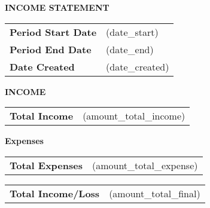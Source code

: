 \documentclass[english]{article}
\providecommand{\tabularnewline}{\\}
\newcommand{\lyxdot}{.}
\begin{document}


\noindent \textbf{INCOME STATEMENT}

\noindent \vspace{10mm}


\noindent \begin{tabular}{ll}
\textbf{Period Start Date} & (date\_start) \tabularnewline
\textbf{Period End Date} & (date\_end) \tabularnewline
\textbf{Date Created} & (date\_created) \tabularnewline
\end{tabular}

\noindent \vspace{10mm}

\noindent \textbf{INCOME}

\noindent \begin{tabular}{>{\raggedright}p{}>{\raggedright}p{}}
\cline{2-2} 
\textbf{Total Income} & (amount\_total\_income)\tabularnewline
\end{tabular}

\noindent \vspace{5mm}


\noindent \textbf{Expenses}

\noindent \begin{tabular}{>{\raggedright}p{}>{\raggedright}p{}}
\cline{2-2} 
\textbf{Total Expenses} & (amount\_total\_expense)\tabularnewline
\end{tabular}

\noindent \vspace{5mm}


\noindent \begin{tabular}{>{\raggedright}p{}>{\raggedright}p{}}
\textbf{Total Income/Loss} & (amount\_total\_final)\tabularnewline
\end{tabular}
\end{document}
